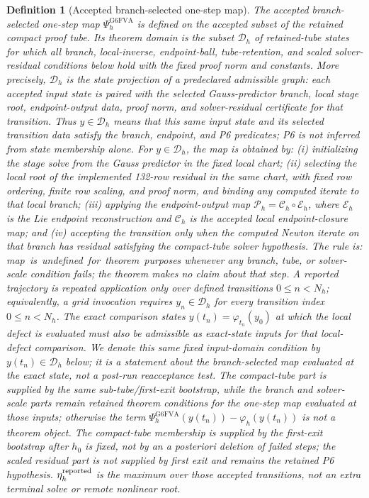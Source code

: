 \documentclass[preprint,12pt]{elsarticle}
\newtheorem{definition}{Definition}
\begin{document}
\begin{definition}[Accepted branch-selected one-step map]
\label{def:accepted-branch-map}
The accepted branch-selected one-step map
\(\Psi_h^{\mathrm{G6FVA}}\) is defined on the accepted subset of the retained
compact proof tube. Its theorem domain is the subset
\(\mathcal D_h\) of retained-tube states for which all branch, local-inverse,
endpoint-ball, tube-retention, and scaled solver-residual conditions below
hold with the fixed proof norm and constants.  More precisely,
\(\mathcal D_h\) is the state projection of a predeclared admissible graph:
each accepted input state is paired with the selected Gauss-predictor branch,
local stage root, endpoint-output data, proof norm, and solver-residual
certificate for that transition.  Thus \(y\in\mathcal D_h\) means that this
same input state and its selected transition data satisfy the branch,
endpoint, and P6 predicates; P6 is not inferred from state membership alone.
For \(y\in\mathcal D_h\), the
map is obtained by: (i) initializing the stage solve from the Gauss predictor
in the fixed local chart; (ii) selecting the local root of the implemented
132-row residual in the same chart, with fixed row ordering, finite row
scaling, and proof norm, and binding any computed iterate to that local
branch; (iii) applying the endpoint-output map
\(\mathcal P_h=\mathcal C_h\circ\mathcal E_h\), where \(\mathcal E_h\) is the
Lie endpoint reconstruction and \(\mathcal C_h\) is the accepted local
endpoint-closure map; and (iv) accepting the transition only when the computed
Newton iterate on that branch has residual satisfying the compact-tube solver
hypothesis. The rule is: \mbox{map is undefined for theorem purposes} whenever any
branch, tube, or solver-scale condition fails; the theorem makes no claim
about that step. A reported trajectory
is repeated application only over defined transitions \(0\le n<N_h\);
equivalently, a grid invocation requires \(y_n\in\mathcal D_h\) for every
transition index \(0\le n<N_h\). The exact comparison states
\(y(t_n)=\varphi_{t_n}(y_0)\) at which the local defect is evaluated must also
be admissible as exact-state inputs for that local-defect comparison. We
denote this same fixed input-domain condition by \(y(t_n)\in\mathcal D_h\)
below; it is a statement about the branch-selected map evaluated at the exact
state, not a post-run reacceptance test. The compact-tube part is supplied by
the same sub-tube/first-exit bootstrap, while
the branch and solver-scale parts remain retained theorem conditions for the
one-step map evaluated at those inputs; otherwise the term
\(\Psi_h^{\mathrm{G6FVA}}(y(t_n))-\varphi_h(y(t_n))\) is not a theorem
object. The compact-tube membership is supplied by the first-exit bootstrap
after \(h_0\) is fixed, not by an a posteriori deletion of failed steps; the
scaled residual part is not supplied by first exit and remains the retained
P6 hypothesis.
\(\eta_h^{\rm reported}\) is the maximum over those accepted transitions, not an extra
terminal solve or remote nonlinear root.
\end{definition}
\end{document}
